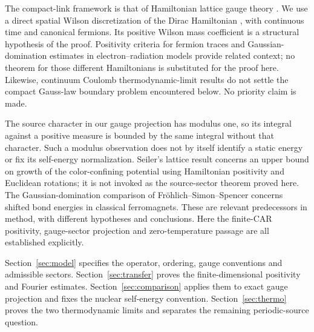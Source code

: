 \documentclass[11pt,letterpaper]{article}
\numberwithin{equation}{section}
\theoremstyle{remark}
\begin{document}
The compact-link framework is that of Hamiltonian lattice gauge
theory \cite{KS}. We use a direct spatial Wilson discretization of
the Dirac Hamiltonian \cite{Zache}, with continuous time and canonical
fermions. Its positive Wilson mass coefficient is a structural
hypothesis of the proof. Positivity criteria for fermion traces
\cite{Wei} and Gaussian-domination estimates in electron--radiation
models \cite{Miyao} provide related context; no theorem for those
different Hamiltonians is substituted for the proof here.
Likewise, continuum Coulomb thermodynamic-limit results
\cite{ThermoI,ThermoII} do not settle the compact Gauss-law boundary
problem encountered below. No priority claim is made.

The source character in our gauge projection has modulus one, so
its integral against a positive measure is bounded by the same
integral without that character. Such a modulus observation does
not by itself identify a static energy or fix its self-energy
normalization. Seiler's lattice result \cite{Seiler} concerns an
upper bound on growth of the color-confining potential using
Hamiltonian positivity and Euclidean rotations; it is not invoked
as the source-sector theorem proved here.
The Gaussian-domination comparison of
Fr\"ohlich--Simon--Spencer \cite[Section 2]{FSS} concerns shifted
bond energies in classical ferromagnets. These are relevant
predecessors in method, with different hypotheses and conclusions.
Here the finite-CAR positivity, gauge-sector projection and
zero-temperature passage are all established explicitly.

Section~\ref{sec:model} specifies the operator, ordering, gauge
conventions and admissible sectors. Section~\ref{sec:transfer}
proves the finite-dimensional positivity and Fourier estimates.
Section~\ref{sec:comparison} applies them to exact gauge projection
and fixes the nuclear self-energy convention.
Section~\ref{sec:thermo} proves the two thermodynamic limits and
separates the remaining periodic-source question.






\end{document}

